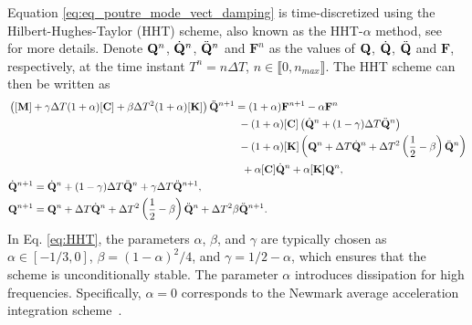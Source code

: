 Equation \eqref{eq:eq_poutre_mode_vect_damping} is time-discretized using the Hilbert-Hughes-Taylor (HHT) scheme, also known as the HHT-\(\alpha\) method, see~\cite{HHT} for more details. Denote \(\mathbf{Q}^{n}\), \(\dot{\mathbf{Q}}^{n}\), \(\ddot{\mathbf{Q}}^{n}\) and ${\mathbf{F}}^{n}$ as the values of \(\mathbf{Q}\), \(\dot{\mathbf{Q}}\), \(\ddot{\mathbf{Q}}\) and ${\mathbf{F}}$, respectively, at the time instant \(T^{n} = n \Delta T\), $n\in\llbracket 0,n_{max}\rrbracket$. The HHT scheme can then be written as
\begin{subequations}\label{eq:HHT}
 \begin{align}
 &\left( [\mathbf{M}] + \gamma \Delta T (1+\alpha) [\mathbf{C}] + \beta \Delta T^2(1+\alpha) [\mathbf{K}] \right) \ddot{\mathbf{Q}}^{n+1} = (1+\alpha){\mathbf{F}}^{n+1} -\alpha {\mathbf{F}}^{n} \nonumber\\
 & \quad \quad \quad \quad \quad   \quad \quad \quad\quad \quad \quad \quad \quad \quad \quad \quad \quad \quad \quad \quad  \quad \quad - (1+\alpha) [\mathbf{C}] \left( \dot{\mathbf{Q}}^{n} + (1-\gamma)\Delta T \ddot{\mathbf{Q}}^{n} \right)\nonumber \\
 & \quad \quad \quad \quad \quad   \quad \quad \quad\quad \quad \quad \quad \quad \quad \quad \quad \quad \quad \quad \quad \quad \quad  - (1+\alpha) [\mathbf{K}]\left( \mathbf{Q}^{n} + \Delta T \dot{\mathbf{Q}}^{n} + \Delta T^2 \left( \frac{1}{2}- \beta\right) \ddot{\mathbf{Q}}^{n}\right)\nonumber\\ &\quad \quad \quad \quad \quad \quad \quad \quad \quad  \quad \quad \quad\quad \quad \quad \ \quad \quad \quad \quad \quad  \quad \quad + \alpha [\mathbf{C}]  \dot{\mathbf{Q}}^{n} + \alpha [\mathbf{K}]  \mathbf{Q}^{n},\label{eq:HHT_a} \\
&\dot{\mathbf{Q}}^{n+1} = \dot{\mathbf{Q}}^{n} + (1-\gamma) \Delta T \ddot{\mathbf{Q}}^{n} + \gamma \Delta T \ddot{\mathbf{Q}}^{n+1},\label{eq:HHT_b} \\
&\mathbf{Q}^{n+1} =  \mathbf{Q}^{n} +  \Delta T \dot{\mathbf{Q}}^{n} + \Delta T^2 \left( \frac{1}{2}- \beta\right) \ddot{\mathbf{Q}}^{n} +  \Delta T^2 \beta \ddot{\mathbf{Q}}^{n+1}.\label{eq:HHT_c}
\end{align}
\end{subequations}
In Eq. \eqref{eq:HHT}, the parameters $\alpha$, $\beta$, and $\gamma$ are typically chosen as \(\alpha \in [-1/3, 0]\), \(\beta = (1 - \alpha)^2 / 4\), and \(\gamma = 1/2 - \alpha\), which ensures that the scheme is unconditionally stable. The parameter \(\alpha\) introduces dissipation for high frequencies. Specifically, \(\alpha = 0\) corresponds to the Newmark average acceleration integration scheme~\cite{newmark1959method}.

